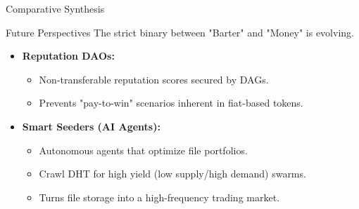 \documentclass[aspectratio=169]{beamer}
\begin{document}
\begin{frame}{Comparative Synthesis}
    \begin{table}[]
        \caption{Comparison of Incentive Mechanisms }
    \end{table}
\end{frame}

\begin{frame}{Future Perspectives}
    The strict binary between "Barter" and "Money" is evolving.
    
    \begin{itemize}
        \item \textbf{Reputation DAOs:}
        \begin{itemize}
            \item Non-transferable reputation scores secured by DAGs.
            \item Prevents "pay-to-win" scenarios inherent in fiat-based tokens.
        \end{itemize}
        
        \vspace{0.3cm}
        \item \textbf{Smart Seeders (AI Agents):}
        \begin{itemize}
            \item Autonomous agents that optimize file portfolios.
            \item Crawl DHT for high yield (low supply/high demand) swarms.
            \item Turns file storage into a high-frequency trading market.
        \end{itemize}
    \end{itemize}
\end{frame}
\end{document}
